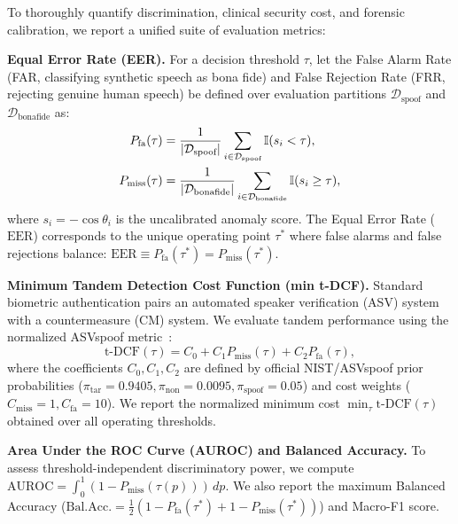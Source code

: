To thoroughly quantify discrimination, clinical security cost, and forensic calibration, we report a unified suite of evaluation metrics:

\noindent\textbf{Equal Error Rate (EER).} For a decision threshold $\tau$, let the False Alarm Rate (FAR, classifying synthetic speech as bona fide) and False Rejection Rate (FRR, rejecting genuine human speech) be defined over evaluation partitions $\mathcal{D}_{\text{spoof}}$ and $\mathcal{D}_{\text{bonafide}}$ as:
\begin{align}
P_{\text{fa}}(\tau) &= \frac{1}{|\mathcal{D}_{\text{spoof}}|} \sum_{i \in \mathcal{D}_{\text{spoof}}} \mathbb{I}(s_i < \tau), \label{eq:far_frr} \\
P_{\text{miss}}(\tau) &= \frac{1}{|\mathcal{D}_{\text{bonafide}}|} \sum_{i \in \mathcal{D}_{\text{bonafide}}} \mathbb{I}(s_i \ge \tau), \notag
\end{align}
where $s_i = -\cos\theta_i$ is the uncalibrated anomaly score. The Equal Error Rate ($\mathrm{EER}$) corresponds to the unique operating point $\tau^*$ where false alarms and false rejections balance: $\mathrm{EER} \equiv P_{\text{fa}}(\tau^*) = P_{\text{miss}}(\tau^*)$.

\noindent\textbf{Minimum Tandem Detection Cost Function (min t-DCF).} Standard biometric authentication pairs an automated speaker verification (ASV) system with a countermeasure (CM) system. We evaluate tandem performance using the normalized ASVspoof metric~\cite{kinnunen2020tdcf}:
\begin{equation}
\mathrm{t\text{-}DCF}(\tau) = C_0 + C_1 P_{\text{miss}}(\tau) + C_2 P_{\text{fa}}(\tau),
\label{eq:tdcf}
\end{equation}
where the coefficients $C_0, C_1, C_2$ are defined by official NIST/ASVspoof prior probabilities ($\pi_{\text{tar}} = 0.9405, \pi_{\text{non}} = 0.0095, \pi_{\text{spoof}} = 0.05$) and cost weights ($C_{\text{miss}} = 1, C_{\text{fa}} = 10$). We report the normalized minimum cost $\min_\tau \mathrm{t\text{-}DCF}(\tau)$ obtained over all operating thresholds.

\noindent\textbf{Area Under the ROC Curve (AUROC) and Balanced Accuracy.} To assess threshold-independent discriminatory power, we compute $\mathrm{AUROC} = \int_0^1 (1 - P_{\text{miss}}(\tau(p))) \, dp$. We also report the maximum Balanced Accuracy ($\mathrm{Bal. Acc.} = \frac{1}{2}(1 - P_{\text{fa}}(\tau^*) + 1 - P_{\text{miss}}(\tau^*))$) and Macro-F1 score.


